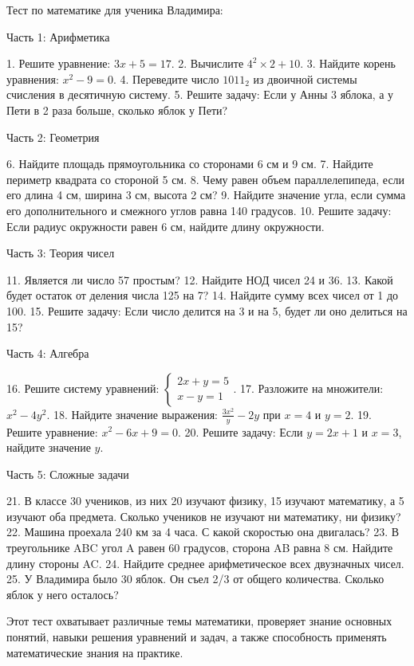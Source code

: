 \documentclass{article}
\begin{document}
Тест по математике для ученика Владимира:

Часть 1: Арифметика

1. Решите уравнение: \(3x + 5 = 17\).
2. Вычислите \(4^2 \times 2 + 10\).
3. Найдите корень уравнения: \(x^2 - 9 = 0\).
4. Переведите число \(1011_2\) из двоичной системы счисления в десятичную систему.
5. Решите задачу: Если у Анны 3 яблока, а у Пети в 2 раза больше, сколько яблок у Пети?

Часть 2: Геометрия

6. Найдите площадь прямоугольника со сторонами 6 см и 9 см.
7. Найдите периметр квадрата со стороной 5 см.
8. Чему равен объем параллелепипеда, если его длина 4 см, ширина 3 см, высота 2 см?
9. Найдите значение угла, если сумма его дополнительного и смежного углов равна 140 градусов.
10. Решите задачу: Если радиус окружности равен 6 см, найдите длину окружности.

Часть 3: Теория чисел

11. Является ли число 57 простым?
12. Найдите НОД чисел 24 и 36.
13. Какой будет остаток от деления числа 125 на 7?
14. Найдите сумму всех чисел от 1 до 100.
15. Решите задачу: Если число делится на 3 и на 5, будет ли оно делиться на 15?

Часть 4: Алгебра

16. Решите систему уравнений: \(\begin{cases} 2x + y = 5 \\ x - y = 1 \end{cases}\).
17. Разложите на множители: \(x^2 - 4y^2\).
18. Найдите значение выражения: \(\frac{3x^2}{y} - 2y\) при \(x = 4\) и \(y = 2\).
19. Решите уравнение: \(x^2 - 6x + 9 = 0\).
20. Решите задачу: Если \(y = 2x + 1\) и \(x = 3\), найдите значение \(y\).

Часть 5: Сложные задачи

21. В классе 30 учеников, из них 20 изучают физику, 15 изучают математику, а 5 изучают оба предмета. Сколько учеников не изучают ни математику, ни физику?
22. Машина проехала 240 км за 4 часа. С какой скоростью она двигалась?
23. В треугольнике ABC угол A равен 60 градусов, сторона AB равна 8 см. Найдите длину стороны AC.
24. Найдите среднее арифметическое всех двузначных чисел.
25. У Владимира было 30 яблок. Он съел 2/3 от общего количества. Сколько яблок у него осталось?

Этот тест охватывает различные темы математики, проверяет знание основных понятий, навыки решения уравнений и задач, а также способность применять математические знания на практике.
\end{document}
